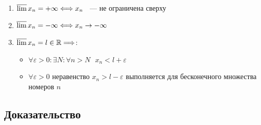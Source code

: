 \documentclass{article}
\begin{document}
            \begin{enumerate}
            
                \item $\varlimsup x_n = +\infty \Longleftrightarrow x_n$ ~--- не ограничена сверху
                
                \item $\varlimsup x_n = -\infty \Longleftrightarrow x_n \rightarrow -\infty$
                
                \item $\varlimsup x_n = l \in \mathbb{R} \Longrightarrow$:
                
                \begin{itemize}
                
                    \item $\forall \varepsilon > 0 : \exists N: \forall n > N \ \ \ x_n < l + \varepsilon$
                    
                    \item $\forall \varepsilon > 0$ неравенство $x_n > l - \varepsilon$ выполняется для бесконечного множества номеров $n$
                
                \end{itemize}
                
            \end{enumerate}
            
        \subsection{Доказательство}
        
\end{document}
